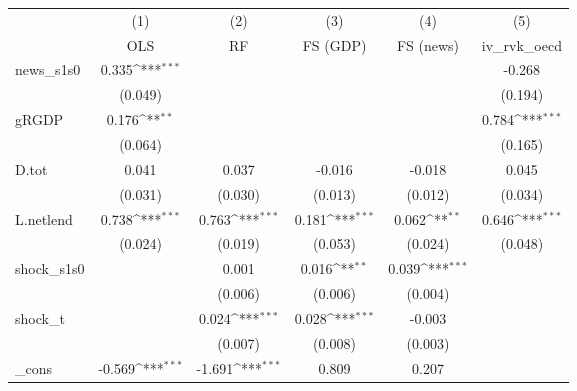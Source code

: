 {
\def\sym#1{\ifmmode^{#1}\else\(^{#1}\)\fi}
\begin{tabular}{l*{5}{c}}
\toprule
            &\multicolumn{1}{c}{(1)}&\multicolumn{1}{c}{(2)}&\multicolumn{1}{c}{(3)}&\multicolumn{1}{c}{(4)}&\multicolumn{1}{c}{(5)}\\
            &\multicolumn{1}{c}{OLS}&\multicolumn{1}{c}{RF}&\multicolumn{1}{c}{FS (GDP)}&\multicolumn{1}{c}{FS (news)}&\multicolumn{1}{c}{iv\_rvk\_oecd}\\
\midrule
news\_s1s0   &       0.335\sym{***}&                     &                     &                     &      -0.268         \\
            &     (0.049)         &                     &                     &                     &     (0.194)         \\
\addlinespace
gRGDP       &       0.176\sym{**} &                     &                     &                     &       0.784\sym{***}\\
            &     (0.064)         &                     &                     &                     &     (0.165)         \\
\addlinespace
D.tot       &       0.041         &       0.037         &      -0.016         &      -0.018         &       0.045         \\
            &     (0.031)         &     (0.030)         &     (0.013)         &     (0.012)         &     (0.034)         \\
\addlinespace
L.netlend   &       0.738\sym{***}&       0.763\sym{***}&       0.181\sym{***}&       0.062\sym{**} &       0.646\sym{***}\\
            &     (0.024)         &     (0.019)         &     (0.053)         &     (0.024)         &     (0.048)         \\
\addlinespace
shock\_s1s0  &                     &       0.001         &       0.016\sym{**} &       0.039\sym{***}&                     \\
            &                     &     (0.006)         &     (0.006)         &     (0.004)         &                     \\
\addlinespace
shock\_t     &                     &       0.024\sym{***}&       0.028\sym{***}&      -0.003         &                     \\
            &                     &     (0.007)         &     (0.008)         &     (0.003)         &                     \\
\addlinespace
\_cons      &      -0.569\sym{***}&      -1.691\sym{***}&       0.809         &       0.207         &                     \\

\end{tabular}}
